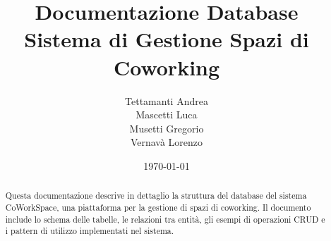 \documentclass[12pt,a4paper]{article}
\title{
    \vspace{-2cm}
    {\Huge \textbf{Documentazione Database}}\\
    \vspace{0.5cm}
    {\large Sistema di Gestione Spazi di Coworking}
}
\author{Tettamanti Andrea \\
        Mascetti Luca \\
        Musetti Gregorio \\
        Vernavà Lorenzo}
\date{\today}
\begin{document}
\maketitle

\newpage

\begin{abstract}
Questa documentazione descrive in dettaglio la struttura del database del sistema CoWorkSpace, una piattaforma per la gestione di spazi di coworking. Il documento include lo schema delle tabelle, le relazioni tra entità, gli esempi di operazioni CRUD e i pattern di utilizzo implementati nel sistema.
\end{abstract}

\newpage
\tableofcontents
\newpage




\end{document}
